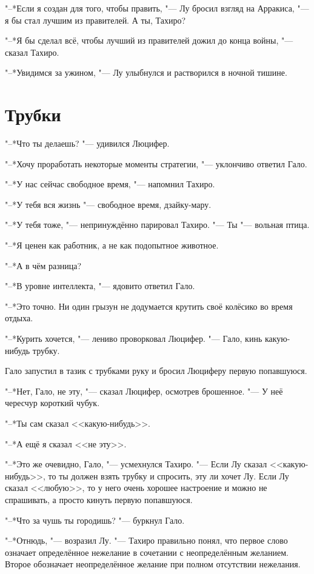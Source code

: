 \documentclass[a4paper,10pt]{book}
\begin{document}
"--*Если я создан для того, чтобы править, "--- Лу бросил взгляд на Арракиса, "--- я бы стал лучшим из правителей.
А ты, Тахиро?

"--*Я бы сделал всё, чтобы лучший из правителей дожил до конца войны, "--- сказал Тахиро.

"--*Увидимся за ужином, "--- Лу улыбнулся и растворился в ночной тишине.

\section{Трубки}

"--*Что ты делаешь? "--- удивился Люцифер.

"--*Хочу проработать некоторые моменты стратегии, "--- уклончиво ответил Гало.

"--*У нас сейчас свободное время, "--- напомнил Тахиро.

"--*У тебя вся жизнь "--- свободное время, дзайку-мару.

"--*У тебя тоже, "--- непринуждённо парировал Тахиро. "--- Ты "--- вольная птица.

"--*Я ценен как работник, а не как подопытное животное.

"--*А в чём разница?

"--*В уровне интеллекта, "--- ядовито ответил Гало.

"--*Это точно. Ни один грызун не додумается крутить своё колёсико во время отдыха.

"--*Курить хочется, "--- лениво проворковал Люцифер. "--- Гало, кинь какую-нибудь трубку.

Гало запустил в тазик с трубками руку и бросил Люциферу первую попавшуюся.

"--*Нет, Гало, не эту, "--- сказал Люцифер, осмотрев брошенное. "--- У неё чересчур короткий чубук.

"--*Ты сам сказал <<какую-нибудь>>.

"--*А ещё я сказал <<не эту>>.

"--*Это же очевидно, Гало, "--- усмехнулся Тахиро. "--- Если Лу сказал <<какую-нибудь>>, то ты должен взять трубку и спросить, эту ли хочет Лу. Если Лу сказал <<любую>>, то у него очень хорошее настроение и можно не спрашивать, а просто кинуть первую попавшуюся.

"--*Что за чушь ты городишь? "--- буркнул Гало.

"--*Отнюдь, "--- возразил Лу. "--- Тахиро правильно понял, что первое слово означает определённое нежелание в сочетании с неопределённым желанием. Второе обозначает неопределённое желание при полном отсутствии нежелания.
\end{document}
